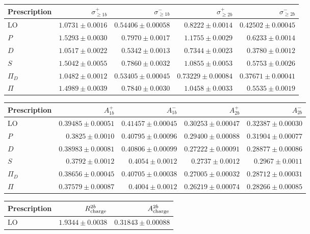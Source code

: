 \begin{table}[htbp]
\centering
\small
\setlength{\tabcolsep}{3pt}
\begin{tabular}{lrrrr}
\toprule
Prescription & $\sigma^+_{\geq1b}$ & $\sigma^-_{\geq1b}$ & $\sigma^+_{\geq2b}$ & $\sigma^-_{\geq2b}$ \\
\midrule
$\mathrm{LO}$ & $1.0731\pm0.0016$ & $0.54406\pm0.00058$ & $0.8222\pm0.0014$ & $0.42502\pm0.00045$ \\
$P$ & $1.5293\pm0.0030$ & $0.7970\pm0.0017$ & $1.1755\pm0.0029$ & $0.6233\pm0.0014$ \\
$D$ & $1.0517\pm0.0022$ & $0.5342\pm0.0013$ & $0.7344\pm0.0023$ & $0.3780\pm0.0012$ \\
$S$ & $1.5042\pm0.0055$ & $0.7860\pm0.0032$ & $1.0855\pm0.0053$ & $0.5753\pm0.0026$ \\
$\Pi_D$ & $1.0482\pm0.0012$ & $0.53405\pm0.00045$ & $0.73229\pm0.00084$ & $0.37671\pm0.00041$ \\
$\Pi$ & $1.4989\pm0.0039$ & $0.7840\pm0.0030$ & $1.0458\pm0.0033$ & $0.5535\pm0.0019$ \\
\bottomrule
\end{tabular}
\par\medskip
\begin{tabular}{lrrrr}
\toprule
Prescription & $A^+_{1b}$ & $A^-_{1b}$ & $A^+_{2b}$ & $A^-_{2b}$ \\
\midrule
$\mathrm{LO}$ & $0.39485\pm0.00051$ & $0.41457\pm0.00045$ & $0.30253\pm0.00047$ & $0.32387\pm0.00030$ \\
$P$ & $0.3825\pm0.0010$ & $0.40795\pm0.00096$ & $0.29400\pm0.00088$ & $0.31904\pm0.00077$ \\
$D$ & $0.38983\pm0.00081$ & $0.40806\pm0.00099$ & $0.27222\pm0.00091$ & $0.28877\pm0.00086$ \\
$S$ & $0.3792\pm0.0012$ & $0.4054\pm0.0012$ & $0.2737\pm0.0012$ & $0.2967\pm0.0011$ \\
$\Pi_D$ & $0.38656\pm0.00045$ & $0.40705\pm0.00038$ & $0.27005\pm0.00032$ & $0.28712\pm0.00031$ \\
$\Pi$ & $0.37579\pm0.00087$ & $0.4004\pm0.0012$ & $0.26219\pm0.00074$ & $0.28266\pm0.00085$ \\
\bottomrule
\end{tabular}
\par\medskip
\begin{tabular}{lrr}
\toprule
Prescription & $R_{\rm charge}^{2b}$ & $A_{\rm charge}^{2b}$ \\
\midrule
$\mathrm{LO}$ & $1.9344\pm0.0038$ & $0.31843\pm0.00088$ \\

\end{tabular}
\end{table}
